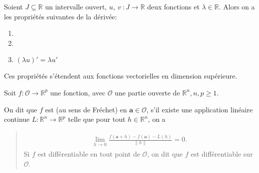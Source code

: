 \documentclass[letterpaper,11pt,english]{sphinxmanual}
\begin{document}
\begin{DUlineblock}{0em}
\item[] 
\item[] Soient \(J\subseteq \mathbb{R}\) un intervalle ouvert,
\(u,\ v\ : J\rightarrow \mathbb{R}\) deux fonctions et
\(\lambda \in \mathbb{R}\). Alors on a les propriétés suivantes de
la dérivée:
\end{DUlineblock}
\begin{enumerate}
%
\item {} 

\item {} 

\item {} 
\sphinxAtStartPar
\((\lambda u)' = \lambda u'\)

\end{enumerate}

\begin{DUlineblock}{0em}
\item[] Ces propriétés s’étendent aux fonctions vectorielles en dimension
supérieure.
\item[] 
\item[] Soit \(f: \mathcal{O}\rightarrow \mathbb{R}^p\) une fonction, avec
\(\mathcal{O}\) une partie ouverte de
\(\mathbb{R}^n, n, p\ge 1\).
\item[] On dit que \(f\) est  (au sens de Fréchet) en
\(\mathbf{a}\in \mathcal{O}\), s’il existe une application
linéaire continue \(L: \mathbb{R}^n\rightarrow \mathbb{R}^p\)
telle que pour tout \(h\in \mathbb{R}^n\), on a
\end{DUlineblock}
\begin{quote}
\begin{equation}\label{equation:chapter2:chapter2:27}
\begin{split}\begin{aligned}
    \lim_{h\rightarrow 0} \frac{f(\mathbf{a}+h)-f(\mathbf{a})-L(h)}{\|h\|}=0.\end{aligned}\end{split}
\end{equation}
\sphinxAtStartPar
Si \(f\) est différentiable en tout point de \(\mathcal{O}\),
on dit que \(f\) est différentiable sur \(\mathcal{O}\).
\end{quote}
\end{document}
